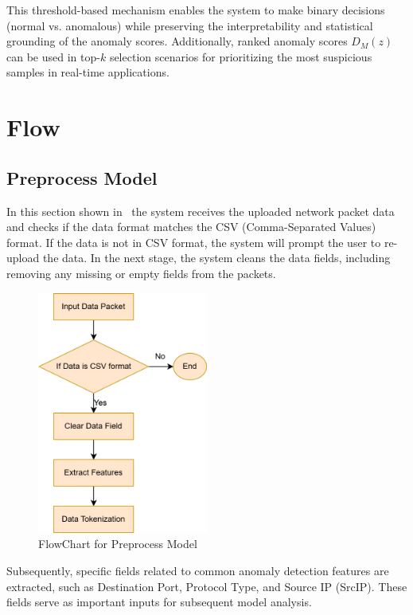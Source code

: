 \begin{ZhChapter}
This threshold-based mechanism enables the system to make binary decisions (normal vs. anomalous) while preserving the interpretability and statistical grounding of the anomaly scores. Additionally, ranked anomaly scores $D_M(z)$ can be used in top-$k$ selection scenarios for prioritizing the most suspicious samples in real-time applications.







\section{Flow} %
\subsection{Preprocess Model}
In this section shown in~\label{fig:FlowChart} the system receives the uploaded network packet data and checks if the data format matches the CSV (Comma-Separated Values) format. If the data is not in CSV format, the system will prompt the user to re-upload the data. In the next stage, the system cleans the data fields, including removing any missing or empty fields from the packets.
\begin{figure}[htbp]
    \centering
    \includegraphics[width = 0.5\textwidth]{image/FlowChart.jpg}
    \caption{FlowChart for Preprocess Model}
    \label{fig:FlowChart}
\end{figure}

Subsequently, specific fields related to common anomaly detection features are extracted, such as Destination Port, Protocol Type, and Source IP (SrcIP). These fields serve as important inputs for subsequent model analysis.


\end{ZhChapter}
